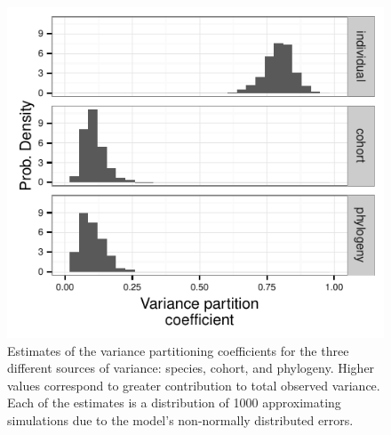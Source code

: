 \begin{figure}[ht]
  \centering
  \includegraphics{chapter_death_taxa/figure/variance_est}
  \caption[Partitioned variance for mammal survival]{Estimates of the variance partitioning coefficients for the three different sources of variance: species, cohort, and phylogeny. Higher values correspond to greater contribution to total observed variance. Each of the estimates is a distribution of 1000 approximating simulations due to the model's non-normally distributed errors.}
  \label{fig:vpc}
\end{figure}

